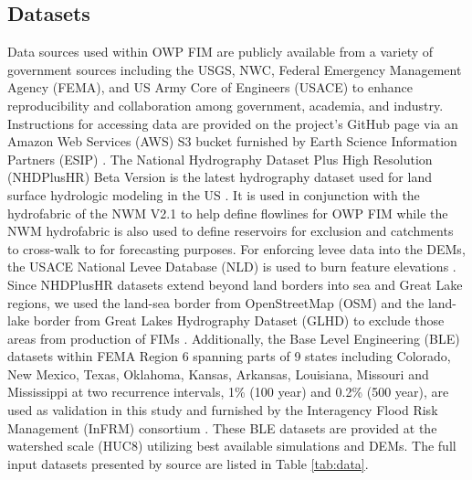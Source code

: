 \subsection{Datasets}
\label{ssec:datasets}
%
Data sources used within OWP FIM are publicly available from a variety of government sources including the USGS, NWC, Federal Emergency Management Agency (FEMA), and US Army Core of Engineers (USACE) to enhance reproducibility and collaboration among government, academia, and industry.
Instructions for accessing data are provided on the project's GitHub page via an Amazon Web Services (AWS) S3 bucket furnished by Earth Science Information Partners (ESIP) \cite{esipData2022}.
The National Hydrography Dataset Plus High Resolution (NHDPlusHR) Beta Version is the latest hydrography dataset used for land surface hydrologic modeling in the US \cite{moore2019user}. 
It is used in conjunction with the hydrofabric of the NWM V2.1 to help define flowlines for OWP FIM while the NWM hydrofabric is also used to define reservoirs for exclusion and catchments to cross-walk to for forecasting purposes.
For enforcing levee data into the DEMs, the USACE National Levee Database (NLD) is used to burn feature elevations \cite{engineers2016national}.
Since NHDPlusHR datasets extend beyond land borders into sea and Great Lake regions, we used the land-sea border from OpenStreetMap (OSM) and the land-lake border from Great Lakes Hydrography Dataset (GLHD) to exclude those areas from production of FIMs \cite{OpenStreetMap,GreatLakesHydrographyDataset}.
Additionally, the Base Level Engineering (BLE) datasets within FEMA Region 6 spanning parts of 9 states including Colorado, New Mexico, Texas, Oklahoma, Kansas, Arkansas, Louisiana, Missouri and Mississippi at two recurrence intervals, 1\% (100 year) and 0.2\% (500 year), are used as validation in this study and furnished by the Interagency Flood Risk Management (InFRM) consortium \cite{fema2021base,fema2021estimated}. 
These BLE datasets are provided at the watershed scale (HUC8) utilizing best available simulations and DEMs.
The full input datasets presented by source are listed in Table \ref{tab:data}.
%
